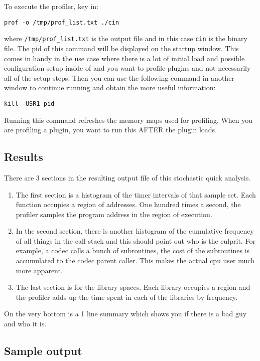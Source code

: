 To execute the profiler, key in:

\hspace{2em}\texttt{prof -o /tmp/prof\_list.txt ./cin}

where \texttt{/tmp/prof\_list.txt} is the output file and in this case \texttt{cin} is the \CGG{} binary file. The pid of this command will be displayed on the startup window. This comes in handy in the use case where there is a lot of initial load and possible configuration setup inside of \CGG{} and you want to profile plugins and not necessarily all of the setup steps. Then you can use the following command in another window to continue running \CGG{} and obtain the more useful information:

\hspace{2em}\texttt{kill -USR1 pid}

Running this command refreshes the memory maps used for profiling. When you are profiling a plugin, you want to run this AFTER the plugin loads.

\subsection{Results}
\label{sub:results}

There are 3 sections in the resulting output file of this stochastic quick analysis.

\begin{enumerate}[nosep]
	\item The first section is a histogram of the timer intervals of that sample set. Each function occupies a region of addresses. One hundred times a second, the profiler samples the program address in the region of execution.
	\item In the second section, there is another histogram of the cumulative frequency of all things in the call stack and this should point out who is the culprit. For example, a codec calls a bunch of subroutines, the cost of the subroutines is accumulated to the codec parent caller. This makes the actual cpu user much more apparent.
	\item The last section is for the library spaces. Each library occupies a region and the profiler adds up the time spent in each of the libraries by frequency.
\end{enumerate}

On the very bottom is a 1 line summary which shows you if there is a bad guy and who it is.

\subsection{Sample output}
\label{sub:sample_output}

